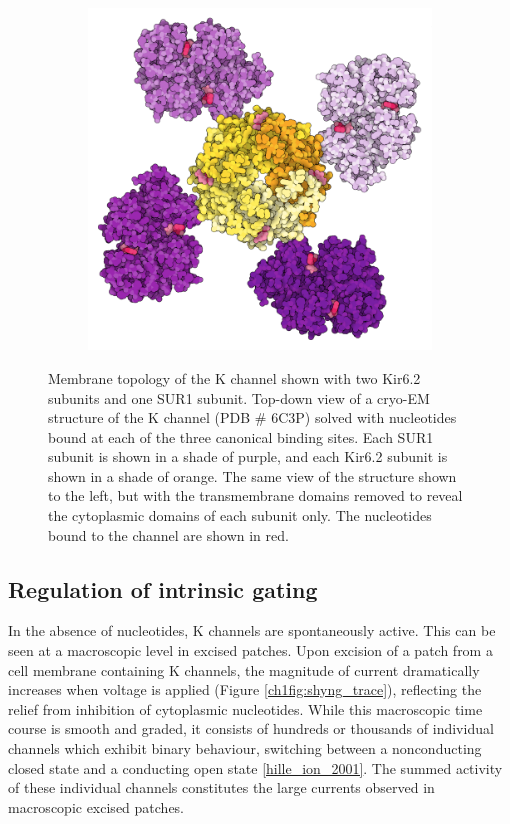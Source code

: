 \begin{figure}[h]
\begin{subfigure}[t]{0.45\textwidth}
		\includegraphics[width=\textwidth]{sur_topdown_ctd_propellor.pdf}
	\end{subfigure}
	\caption[K\ATP{} architecture and nucleotide regulation]{
		 Membrane topology of the K\ATP{} channel shown with two Kir6.2 subunits and one SUR1 subunit.
		 Top-down view of a cryo-EM structure of the K\ATP{} channel (PDB \# 6C3P) solved with nucleotides bound at each of the three canonical binding sites.
		Each SUR1 subunit is shown in a shade of purple, and each Kir6.2 subunit is shown in a shade of orange.
		 The same view of the structure shown to the left, but with the transmembrane domains removed to reveal the cytoplasmic domains of each subunit only.
		The nucleotides bound to the channel are shown in red.
	}
\end{figure}

\subsection{Regulation of intrinsic gating}

In the absence of nucleotides, K\ATP{} channels are spontaneously active.
This can be seen at a macroscopic level in excised patches.
Upon excision of a patch from a cell membrane containing K\ATP{} channels, the magnitude of current dramatically increases when voltage is applied (Figure \ref{ch1fig:shyng_trace}), reflecting the relief from inhibition of cytoplasmic nucleotides.
While this macroscopic time course is smooth and graded, it consists of hundreds or thousands of individual channels which exhibit binary behaviour, switching between a nonconducting closed state and a conducting open state \ref{hille_ion_2001}.
The summed activity of these individual channels constitutes the large currents observed in macroscopic excised patches.

